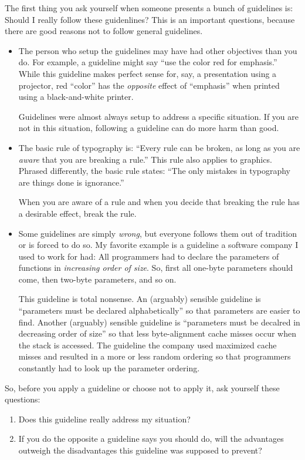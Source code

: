 The first thing you ask yourself when someone presents a bunch of
guidelines is: Should I really follow these guidenlines? This is an
important questions, because there are good reasons not to follow
general guidelines.
\begin{itemize}
\item
  The person who setup the guidelines may have had other
  objectives than you do. For example, a guideline might say ``use the
  color red for emphasis.'' While this guideline makes perfect sense
  for, say, a presentation using a projector, red ``color'' has the
  \emph{opposite} effect of ``emphasis'' when printed using a
  black-and-white printer.

  Guidelines were almost always setup to address a specific
  situation. If you are not in this situation, following a guideline
  can do more harm than good.
\item
  The basic rule of typography is: ``Every rule can be broken, as long
  as you are \emph{aware}  that you are breaking a rule.'' This rule
  also applies to graphics. Phrased differently, the basic rule
  states: ``The only mistakes in typography are things done is
  ignorance.''

  When you are aware of a rule and when you decide that breaking the
  rule has a desirable effect, break the rule.
\item
  Some guidelines are simply \emph{wrong}, but everyone follows them
  out of tradition or is forced to do so. My favorite example is a 
  guideline a software company I used to work for had: All programmers
  had to declare the parameters of functions in \emph{increasing order
    of size}. So, first all one-byte   parameters should come, then
  two-byte parameters, and so on. 

  This guideline is total nonsense. An (arguably) sensible guideline
  is ``parameters must be declared alphabetically'' so that parameters
  are easier to find. Another (arguably) sensible guideline is
  ``parameters must be decalred in decreasing order of size'' so that
  less byte-alignment cache misses occur when the stack is
  accessed. The guideline the company used maximized cache misses and
  resulted in a more or less random ordering so that programmers
  constantly had to look up the parameter ordering.
\end{itemize}

So, before you apply a guideline or choose not to apply it, ask
yourself these questions: 
\begin{enumerate}
\item
  Does this guideline really address my situation?
\item
  If you do the opposite a guideline says you should do, will the
  advantages outweigh the disadvantages this guideline was supposed to
  prevent?  
\end{enumerate}



